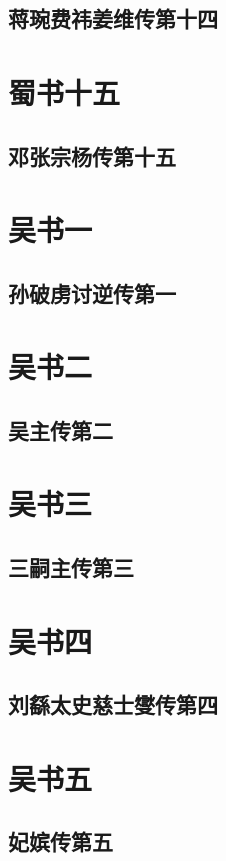 \documentclass[12pt,UTF8]{ctexbook}
\begin{document}
\chapter{蒋琬费祎姜维传第十四}

\part{蜀书十五}
\chapter{邓张宗杨传第十五}

\part{吴书一}
\chapter{孙破虏讨逆传第一}

\part{吴书二}
\chapter{吴主传第二}

\part{吴书三}
\chapter{三嗣主传第三}

\part{吴书四}
\chapter{刘繇太史慈士燮传第四}

\part{吴书五}
\chapter{妃嫔传第五}
\end{document}
